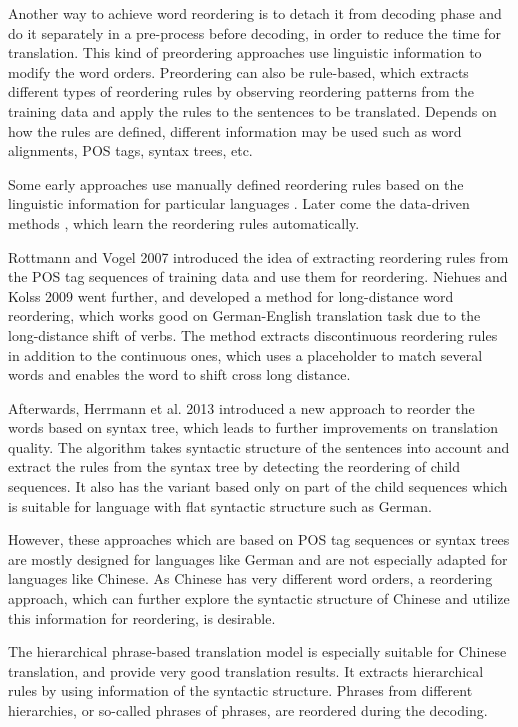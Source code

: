 \documentclass[a4paper]{article}
\begin{document}
Another way to achieve word reordering is to detach it from decoding phase and do it separately in a pre-process before decoding, in order to reduce the time for translation. This kind of preordering approaches use linguistic information to modify the word orders. Preordering can also be rule-based, which extracts different types of reordering rules by observing reordering patterns from the training data and apply the rules to the sentences to be translated. Depends on how the rules are defined, different information may be used such as word alignments, POS tags, syntax trees, etc.

Some early approaches use manually defined reordering rules based on the linguistic information for particular languages \cite{collins2005clause, popovic2006pos,habash2007syntactic,syntactic}. Later come the data-driven methods \cite{zhang2007chunk, crego2008using}, which learn the reordering rules automatically. 

Rottmann and Vogel 2007 \cite{short} introduced the idea of extracting reordering rules from the POS tag sequences of training data and use them for reordering. Niehues and Kolss 2009 \cite{long} went further, and developed a method for long-distance word reordering, which works good on German-English translation task due to the long-distance shift of verbs. The method extracts discontinuous reordering rules in addition to the continuous ones, which uses a placeholder to match several words and enables the word to shift cross long distance.

Afterwards, Herrmann et al. 2013 \cite{tree} introduced a new approach to reorder the words based on syntax tree, which leads to further improvements on translation quality. The algorithm takes syntactic structure of the sentences into account and extract the rules from the syntax tree by detecting the reordering of child sequences. It also has the variant based only on part of the child sequences which is suitable for language with flat syntactic structure such as German.

However, these approaches which are based on POS tag sequences or syntax trees are mostly designed for languages like German and are not especially adapted for languages like Chinese. As Chinese has very different word orders, a reordering approach, which can further explore the syntactic structure of Chinese and utilize this information for reordering, is desirable.

The hierarchical phrase-based translation model \cite{hier} is especially suitable for Chinese translation, and provide very good translation results. It extracts hierarchical rules by using information of the syntactic structure. Phrases from different hierarchies, or so-called phrases of phrases, are reordered during the decoding. 
\end{document}
